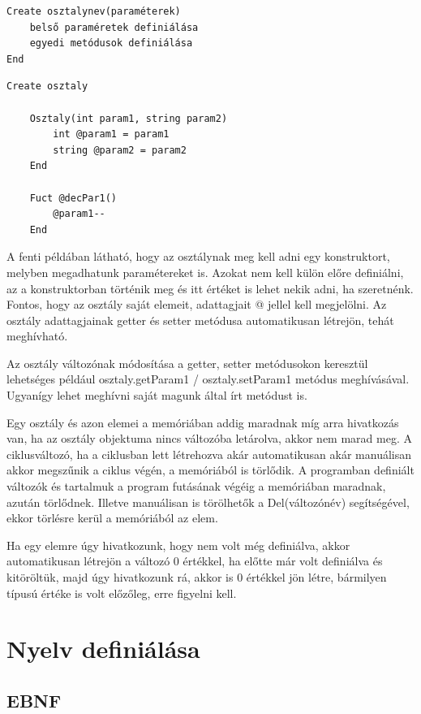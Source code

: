 \begin{verbatim}
Create osztalynev(paraméterek)
	belső paraméretek definiálása
	egyedi metódusok definiálása
End
\end{verbatim}

\begin{verbatim}
Create osztaly
	
	Osztaly(int param1, string param2)
		int @param1 = param1
		string @param2 = param2
	End
		
	Fuct @decPar1()
		@param1--
	End
\end{verbatim}

A fenti példában látható, hogy az osztálynak meg kell adni egy konstruktort, melyben megadhatunk paramétereket is. Azokat nem kell külön előre definiálni, az a konstruktorban történik meg és itt értéket is lehet nekik adni, ha szeretnénk. Fontos, hogy az osztály saját elemeit, adattagjait @ jellel kell megjelölni. Az osztály adattagjainak getter és setter metódusa automatikusan létrejön, tehát meghívható.

Az osztály változónak módosítása a getter, setter metódusokon keresztül lehetséges például osztaly.getParam1 / osztaly.setParam1 metódus meghívásával. Ugyanígy lehet meghívni saját magunk által írt metódust is.

Egy osztály és azon elemei a memóriában addig maradnak míg arra hivatkozás van, ha az osztály objektuma nincs változóba letárolva, akkor nem marad meg. A ciklusváltozó, ha a ciklusban lett létrehozva akár automatikusan akár manuálisan akkor megszűnik a ciklus végén, a memóriából is törlődik. A programban definiált változók és tartalmuk a program futásának végéig a memóriában maradnak, azután törlődnek. Illetve manuálisan is törölhetők a Del(változónév) segítségével, ekkor törlésre kerül a memóriából az elem.

Ha egy elemre úgy hivatkozunk, hogy nem volt még definiálva, akkor automatikusan létrejön a változó 0 értékkel, ha előtte már volt definiálva és kitöröltük, majd úgy hivatkozunk rá, akkor is 0 értékkel jön létre, bármilyen típusú értéke is volt előzőleg, erre figyelni kell.

\section{Nyelv definiálása}

\subsection{EBNF}

